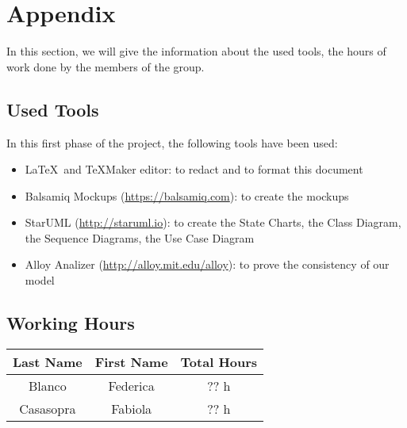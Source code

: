 \section{Appendix} \label{sec:appendix}

In this section, we will give the information about the used tools, the hours of work done by the members of the group.

\subsection{Used Tools} \label{tools}

In this first phase of the project, the following tools have been used:

\begin{itemize}
	\item \LaTeX\ and TeXMaker editor: to redact and to format this document
	\item Balsamiq Mockups (\url{https://balsamiq.com}): to create the mockups
	\item StarUML (\url{http://staruml.io}): to create the State Charts, the Class Diagram, the Sequence Diagrams, the Use Case Diagram 
	\item Alloy Analizer (\url{http://alloy.mit.edu/alloy}): to prove the consistency of our model
\end{itemize}

\subsection{Working Hours} \label{worked}

\begin{table}[htbp]
\begin{center}
\begin{tabular}[t]{ccc}

\hline
\textbf{Last Name} & \textbf{First Name} & \textbf{Total Hours} \\
\hline
Blanco & Federica &  ?? h\\
\hline
Casasopra & Fabiola &  ?? h\\
\hline

\end{tabular}
\end{center}
\end{table}

